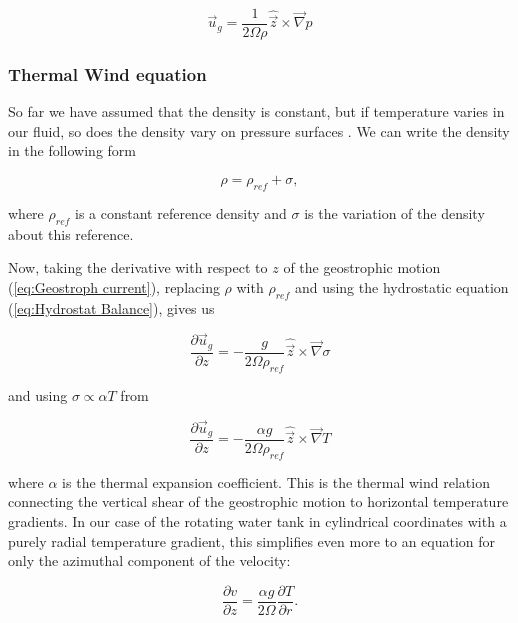 \documentclass[12pt, a4paper]{article} %
\newcommand{\todoEnglish}{\todo[color=red!20]}
\begin{document}
		\begin{equation}
			\vec{u}_g = \frac{1}{2\Omega \rho} \hat{\vec{z}} \times \vec{\nabla}p
			\label{eq:Geostroph current}
		\end{equation}
		
		\subsubsection{Thermal Wind equation}
			So far we have assumed that the density is constant, but if temperature varies in our fluid, so does the density vary on pressure surfaces \todoEnglish{this doesn't sound good..}. We can write the density in the following form
			
			\begin{equation}
				\rho = \rho_{ref} + \sigma ,
				\label{eq:Density}
			\end{equation} 
		
		where $\rho_{ref}$ is a constant reference density and $\sigma$ is the variation of the density about this reference. %
		
		Now, taking the derivative with respect to $z$ of the geostrophic motion (\ref{eq:Geostroph current}), replacing $\rho$ with $\rho_{ref}$ and using the hydrostatic equation (\ref{eq:Hydrostat Balance}), gives us
		
		\begin{equation}
			\frac{\partial \vec{u}_g}{\partial z} = - \frac{g}{2\Omega \rho_{ref}} \hat{\vec{z}} \times \vec{\nabla} \sigma
		\end{equation}
		
		and using $\sigma \propto \alpha T$ from %
		
		\begin{equation}
			\frac{\partial \vec{u}_g}{\partial z} = - \frac{\alpha g}{2\Omega \rho_{ref}} \hat{\vec{z}} \times \vec{\nabla} T
		\end{equation}
		
		where $\alpha$ is the thermal expansion coefficient. This is the thermal wind relation connecting the vertical shear of the geostrophic motion to horizontal temperature gradients. In our case of the rotating water tank in cylindrical coordinates with a purely radial temperature gradient, this simplifies even more to an equation for only the azimuthal component of the velocity:
		
		\begin{equation}
			\frac{\partial v}{\partial z} = \frac{\alpha g}{2\Omega} \frac{\partial T}{\partial r} .
			\label{eq:Thermal Wind}
		\end{equation}
		
\end{document}
